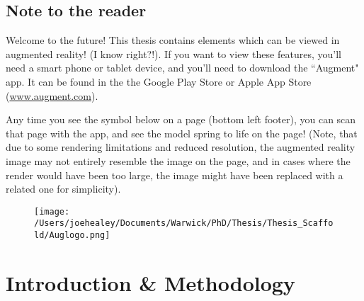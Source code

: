 \documentclass[a4paper, oneside, 11pt]{report} %
\begin{document}
\normalsize
\newpage
\chapter*{Note to the reader}


Welcome to the future! This thesis contains elements which can be viewed in augmented reality! (I know right?!). If you want to view these features, you'll need a smart phone or tablet device, and you'll need to download the ``Augment" app. It can be found in the the Google Play Store or Apple App Store (\url{www.augment.com}).

Any time you see the symbol below on a page (bottom left footer), you can scan that page with the app, and see the model spring to life on the page! (Note, that due to some rendering limitations and reduced resolution, the augmented reality image may not entirely resemble the image on the page, and in cases where the render would have been too large, the image might have been replaced with a related one for simplicity).

\vspace{1cm}
\begin{figure}[h!]
\centering
    \texttt{[image: /Users/joehealey/Documents/Warwick/PhD/Thesis/Thesis\_Scaffold/Auglogo.png]}
\end{figure}

\newpage


\setcounter{page}{1}
\part{Introduction \& Methodology}

\newpage


\newpage
\end{document}
